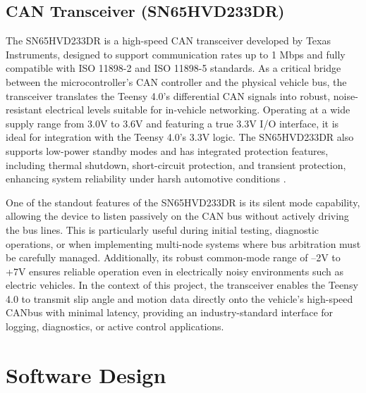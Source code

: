 \documentclass[12pt]{article}
\begin{document}
        \subsection{CAN Transceiver (SN65HVD233DR)}

            The SN65HVD233DR is a high-speed CAN transceiver developed by Texas Instruments, designed to support communication rates up to 1 Mbps and fully compatible 
            with ISO 11898-2 and ISO 11898-5 standards. As a critical bridge between the microcontroller's CAN controller and the physical vehicle bus, the transceiver 
            translates the Teensy 4.0’s differential CAN signals into robust, noise-resistant electrical levels suitable for in-vehicle networking. Operating at a wide 
            supply range from 3.0V to 3.6V and featuring a true 3.3V I/O interface, it is ideal for integration with the Teensy 4.0’s 3.3V logic. The SN65HVD233DR also 
            supports low-power standby modes and has integrated protection features, including thermal shutdown, short-circuit protection, and transient protection, 
            enhancing system reliability under harsh automotive conditions \autocite{TI}.

            One of the standout features of the SN65HVD233DR is its silent mode capability, allowing the device to listen passively on the CAN bus without actively 
            driving the bus lines. This is particularly useful during initial testing, diagnostic operations, or when implementing multi-node systems where bus arbitration 
            must be carefully managed. Additionally, its robust common-mode range of –2V to +7V ensures reliable operation even in electrically noisy environments such 
            as electric vehicles. In the context of this project, the transceiver enables the Teensy 4.0 to transmit slip angle and motion data directly onto the vehicle’s 
            high-speed CANbus with minimal latency, providing an industry-standard interface for logging, diagnostics, or active control applications.

    \section{Software Design}
\end{document}
